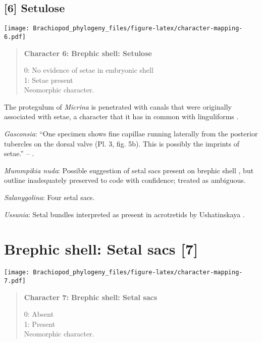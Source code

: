 \documentclass[openany]{book}
\theoremstyle{definition}
\theoremstyle{definition}
\theoremstyle{definition}
\theoremstyle{remark}
\begin{document}
\subsection*{{[}6{]} Setulose}\label{setulose}

\texttt{[image: Brachiopod\_phylogeny\_files/figure-latex/character-mapping-6.pdf]}

\begin{quote}
\textbf{Character 6: Brephic shell: Setulose}

0: No evidence of setae in embryonic shell\\
1: Setae present\\
Neomorphic character.
\end{quote}

The protegulum of \emph{Micrina} is penetrated with canals that were
originally associated with setae, a character that it has in common with
linguliforms \citep{Holmer2011Firstrecord}.

\hypertarget{Gasconsia-coding-6}{}
\emph{Gasconsia}: ``One specimen shows fine capillae running laterally
from the posterior tubercles on the dorsal valve (Pl. 3, fig. 5b). This
is possibly the imprints of setae.'' --
\citet{Ushatinskaya2016Revisionof}.

\hypertarget{Mummpikia_nuda-coding-6}{}
\emph{Mummpikia nuda}: Possible suggestion of setal sacs present on
brephic shell \citep{Holmer1997EarlyCambrian, Li2004}, but outline
inadequately preserved to code with confidence; treated as ambiguous.

\hypertarget{Salanygolina-coding-6}{}
\emph{Salanygolina}: Four setal sacs.

\hypertarget{Ussunia-coding-6}{}
\emph{Ussunia}: Setal bundles interpreted as present in acrotretids by
Ushatinskaya \citeyearpar{Ushatinskaya2016Protegulumand}.

\section{Brephic shell: Setal sacs
{[}7{]}}\label{brephic-shell-setal-sacs-7}

\texttt{[image: Brachiopod\_phylogeny\_files/figure-latex/character-mapping-7.pdf]}

\begin{quote}
\textbf{Character 7: Brephic shell: Setal sacs}

0: Absent\\
1: Present\\
Neomorphic character.
\end{quote}
\end{document}
